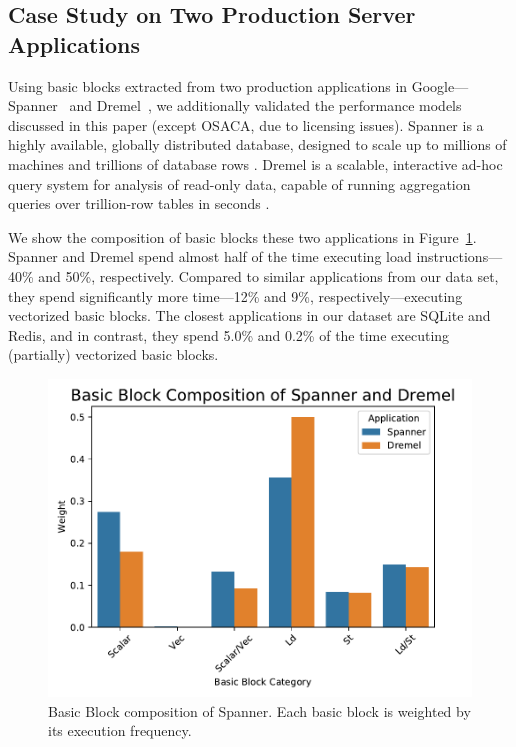 \subsection{Case Study on Two Production Server Applications}
Using basic blocks extracted from two production applications in Google---Spanner~\cite{spanner} and Dremel~\cite{dremel},
we additionally validated the performance models discussed in this paper 
(except OSACA, due to licensing issues).
Spanner is a highly available, globally distributed database,
designed to scale up to millions of machines and trillions of database rows \cite{spanner}.
Dremel is a scalable,
interactive ad-hoc query system for analysis of read-only data,
capable of running aggregation queries over trillion-row tables in seconds \cite{dremel}.

We show the composition of basic blocks these two applications in Figure~\ref{fig:google-blocks}.
Spanner and Dremel spend almost half of the time executing load instructions---40\% and 50\%, respectively. 
Compared to similar applications from our 
data set,
they spend significantly more
time---12\% and 9\%, respectively---executing vectorized basic blocks.
The closest applications in our dataset are
SQLite and Redis, and in contrast, they spend 5.0\% and 0.2\%
of the time executing (partially) vectorized basic blocks.

\begin{figure}[htbp!]
    \includegraphics[width=0.95\columnwidth]{figures/google-blocks.pdf}
    \caption{Basic Block composition of Spanner. Each basic block is weighted by its
    execution frequency.}
    \label{fig:google-blocks}
\end{figure}

